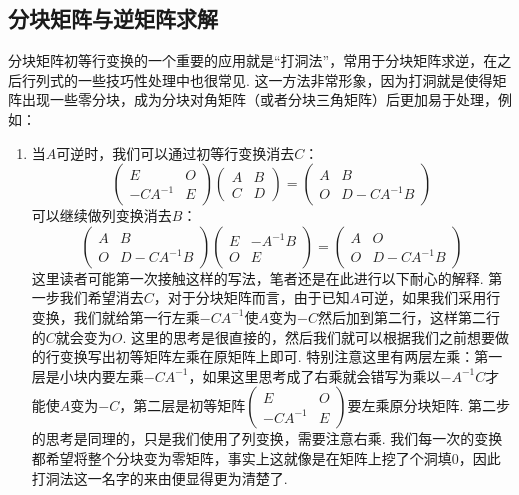\subsection{分块矩阵与逆矩阵求解}

分块矩阵初等行变换的一个重要的应用就是``打洞法''，常用于分块矩阵求逆，在之后行列式的一些技巧性处理中也很常见. 这一方法非常形象，因为打洞就是使得矩阵出现一些零分块，成为分块对角矩阵（或者分块三角矩阵）后更加易于处理，例如：
\begin{enumerate}
    \item 当$A$可逆时，我们可以通过初等行变换消去$C$：
          \[ \begin{pmatrix}
                  E & O \\ -CA^{-1} & E
              \end{pmatrix}\begin{pmatrix}
                  A & B \\ C & D
              \end{pmatrix}=\begin{pmatrix}
                  A & B \\ O & D-CA^{-1}B
              \end{pmatrix} \]
          可以继续做列变换消去$B$：
          \[ \begin{pmatrix}
                  A & B \\ O & D-CA^{-1}B
              \end{pmatrix}\begin{pmatrix}
                  E & -A^{-1}B \\ O & E
              \end{pmatrix}=\begin{pmatrix}
                  A & O \\ O & D-CA^{-1}B
              \end{pmatrix} \]
          这里读者可能第一次接触这样的写法，笔者还是在此进行以下耐心的解释. 第一步我们希望消去$C$，对于分块矩阵而言，由于已知$A$可逆，如果我们采用行变换，我们就给第一行左乘$-CA^{-1}$使$A$变为$-C$然后加到第二行，这样第二行的$C$就会变为$O$. 这里的思考是很直接的，然后我们就可以根据我们之前想要做的行变换写出初等矩阵左乘在原矩阵上即可. 特别注意这里有两层左乘：第一层是小块内要左乘$-CA^{-1}$，如果这里思考成了右乘就会错写为乘以$-A^{-1}C$才能使$A$变为$-C$，第二层是初等矩阵$\begin{pmatrix}
                  E & O \\ -CA^{-1} & E
              \end{pmatrix}$要左乘原分块矩阵. 第二步的思考是同理的，只是我们使用了列变换，需要注意右乘. 我们每一次的变换都希望将整个分块变为零矩阵，事实上这就像是在矩阵上挖了个洞填0，因此打洞法这一名字的来由便显得更为清楚了.


\end{enumerate}

